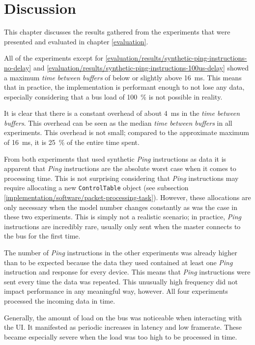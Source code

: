 \chapter{Discussion}
\label{discussion}

This chapter discusses the results gathered from the experiments that were presented and evaluated in
chapter \ref{evaluation}.
\bigbreak

All of the experiments except for \ref{evaluation/results/synthetic-ping-instructions-no-delay} and
\ref{evaluation/results/synthetic-ping-instructions-100us-delay} showed a maximum \textit{time between buffers}
of below or slightly above \SI{16}{\milli\second}. This means that in practice, the implementation is
performant enough to not lose any data, especially considering that a bus load of \SI{100}{\percent}
is not possible in reality.

It is clear that there is a constant overhead of about \SI{4}{\milli\second} in the
\textit{time between buffers}. This overhead can be seen as the median \textit{time between buffers}
in all experiments. This overhead is not small; compared to the approximate maximum of \SI{16}{\milli\second},
it is \SI{25}{\percent} of the entire time spent.

From both experiments that used synthetic \textit{Ping} instructions as data it is apparent that
\textit{Ping} instructions are the absolute worst case when it comes to processing time. This is
not surprising considering that \textit{Ping} instructions may require allocating a new
\lstinline{ControlTable} object (see subsection \ref{implementation/software/packet-processing-task}).
However, these allocations are only necessary when the model number changes constantly as was the case
in these two experiments. This is simply not a realistic scenario; in practice, \textit{Ping} instructions
are incredibly rare, usually only sent when the master connects to the bus for the first time.

The number of \textit{Ping} instructions in the other experiments was already higher than to be expected
because the data they used contained at least one \textit{Ping} instruction and response for every device.
This means that \textit{Ping} instructions were sent every time the data was repeated. This unusually
high frequency did not impact performance in any meaningful way, however. All four experiments processed
the incoming data in time.

Generally, the amount of load on the bus was noticeable when interacting with the UI. It manifested
as periodic increases in latency and low framerate. These became especially severe when the load was
too high to be processed in time.

